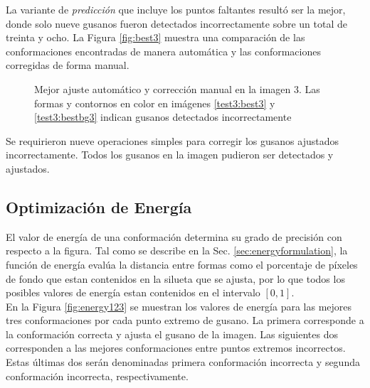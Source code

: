 La variante de \emph{predicci\'on} que incluye los puntos faltantes result\'o ser la mejor, donde solo nueve gusanos
fueron detectados incorrectamente sobre un total de treinta y ocho. La Figura \ref{fig:best3} 
muestra una comparaci\'on de las conformaciones encontradas de manera autom\'atica y 
las conformaciones corregidas de forma manual.

\begin{figure}[h!]
  \centering
\qquad
\qquad
  \label{best3:c}
\qquad
\caption[Mejor ajuste autom\'atico y correcci\'on manual en la imagen 3]{Mejor ajuste autom\'atico y correcci\'on manual en la imagen 3.
Las formas y contornos en color en im\'agenes \ref{test3:best3} y \ref{test3:bestbg3} indican gusanos detectados incorrectamente} 
 \end{figure}

Se requirieron nueve operaciones simples para corregir los gusanos ajustados
incorrectamente. Todos los gusanos en la imagen pudieron ser detectados
y ajustados.

\subsection{Optimizaci\'on de Energ\'ia}

El valor de energ\'ia de una conformaci\'on determina su grado de precisi\'on
con respecto a la figura. Tal como se describe en la Sec. \ref{sec:energyformulation},
la funci\'on de energ\'ia eval\'ua la distancia entre formas como el porcentaje
de p\'ixeles de fondo que estan contenidos en la silueta que se ajusta, por lo que
todos los posibles valores de energ\'ia estan contenidos en el intervalo $[0,1]$.\\

En la Figura \ref{fig:energy123} se muestran los valores de energ\'ia para las mejores
tres conformaciones por cada punto extremo de gusano. La primera corresponde a la 
conformaci\'on correcta y ajusta el gusano de la imagen. Las siguientes dos
corresponden a las mejores conformaciones entre puntos extremos incorrectos. 
Estas \'ultimas dos ser\'an denominadas primera conformaci\'on incorrecta y 
segunda conformaci\'on incorrecta, respectivamente.

